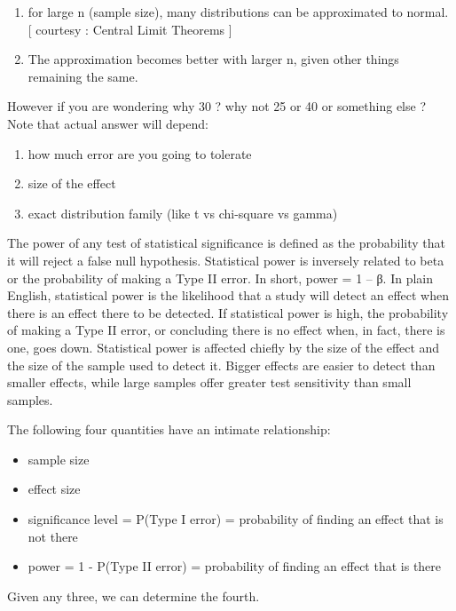 \documentclass[]{book}
\begin{document}
\begin{enumerate}
\def\labelenumi{\arabic{enumi})}
\item
  for large n (sample size), many distributions can be approximated to
  normal. {[} courtesy : Central Limit Theorems {]}
\item
  The approximation becomes better with larger n, given other things
  remaining the same.
\end{enumerate}

However if you are wondering why 30 ? why not 25 or 40 or something else
? Note that actual answer will depend:

\begin{enumerate}
\def\labelenumi{\arabic{enumi})}
\item
  how much error are you going to tolerate
\item
  size of the effect
\item
  exact distribution family (like t vs chi-square vs gamma)
\end{enumerate}

The power of any test of statistical significance is defined as the
probability that it will reject a false null hypothesis. Statistical
power is inversely related to beta or the probability of making a Type
II error. In short, power = 1 -- β. In plain English, statistical power
is the likelihood that a study will detect an effect when there is an
effect there to be detected. If statistical power is high, the
probability of making a Type II error, or concluding there is no effect
when, in fact, there is one, goes down. Statistical power is affected
chiefly by the size of the effect and the size of the sample used to
detect it. Bigger effects are easier to detect than smaller effects,
while large samples offer greater test sensitivity than small samples.

The following four quantities have an intimate relationship:

\begin{itemize}
\item
  sample size
\item
  effect size
\item
  significance level = P(Type I error) = probability of finding an
  effect that is not there
\item
  power = 1 - P(Type II error) = probability of finding an effect that
  is there
\end{itemize}

Given any three, we can determine the fourth.
\end{document}
